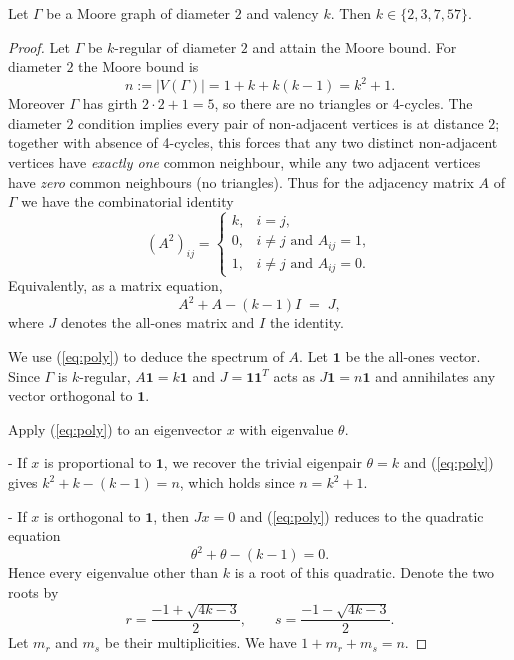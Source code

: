 \documentclass[10pt,a4paper]{amsart}
\begin{document}
\begin{theorem}
Let \(\Gamma\) be a Moore graph of diameter \(2\) and valency \(k\).
Then \(k\in\{2,3,7,57\}\).
\end{theorem}

\begin{proof}
Let \(\Gamma\) be \(k\)-regular of diameter \(2\) and attain the Moore
bound. For diameter \(2\) the Moore bound is
\[
n := |V(\Gamma)| = 1 + k + k(k-1) = k^2 + 1.
\]
Moreover \(\Gamma\) has girth \(2\cdot 2 + 1 = 5\), so there are no
triangles or 4-cycles. The diameter \(2\) condition implies every pair
of non-adjacent vertices is at distance \(2\); together with absence of
4-cycles, this forces that any two distinct non-adjacent vertices have
\emph{exactly one} common neighbour, while any two adjacent vertices
have \emph{zero} common neighbours (no triangles). Thus for the adjacency
matrix \(A\) of \(\Gamma\) we have the combinatorial identity
\[
(A^2)_{ij} =
\begin{cases}
k, & i=j,\\[3pt]
0, & i\ne j \text{ and } A_{ij}=1,\\[3pt]
1, & i\ne j \text{ and } A_{ij}=0.
\end{cases}
\]
Equivalently, as a matrix equation,
\begin{equation}\label{eq:poly}
A^2 + A - (k-1)I \;=\; J,
\end{equation}
where \(J\) denotes the all-ones matrix and \(I\) the identity.

We use (\ref{eq:poly}) to deduce the spectrum of \(A\). Let \(\mathbf{1}\)
be the all-ones vector. Since \(\Gamma\) is \(k\)-regular,
\(A\mathbf{1}=k\mathbf{1}\) and \(J=\mathbf{1}\mathbf{1}^T\) acts as
\(J\mathbf{1}=n\mathbf{1}\) and annihilates any vector orthogonal to
\(\mathbf{1}\).

Apply (\ref{eq:poly}) to an eigenvector \(x\) with eigenvalue \(\theta\).

- If \(x\) is proportional to \(\mathbf{1}\), we recover the trivial
  eigenpair \(\theta=k\) and (\ref{eq:poly}) gives
  \(k^2 + k - (k-1) = n\), which holds since \(n=k^2+1\).

- If \(x\) is orthogonal to \(\mathbf{1}\), then \(Jx=0\) and
  (\ref{eq:poly}) reduces to the quadratic equation
  \[
  \theta^2 + \theta - (k-1) = 0.
  \]
  Hence every eigenvalue other than \(k\) is a root of this quadratic.
  Denote the two roots by
  \[
  r = \frac{-1 + \sqrt{4k-3}}{2},\qquad s = \frac{-1 - \sqrt{4k-3}}{2}.
  \]
  Let \(m_r\) and \(m_s\) be their multiplicities. We have \(1+m_r+m_s=n\).


\end{proof}
\end{document}
